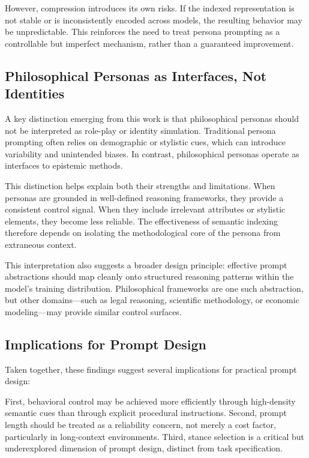 \documentclass[11pt]{article}
\begin{document}
However, compression introduces its own risks. If the indexed representation is not stable or is inconsistently encoded across models, the resulting behavior may be unpredictable. This reinforces the need to treat persona prompting as a controllable but imperfect mechanism, rather than a guaranteed improvement.

\subsection{Philosophical Personas as Interfaces, Not Identities}

A key distinction emerging from this work is that philosophical personas should not be interpreted as role-play or identity simulation. Traditional persona prompting often relies on demographic or stylistic cues, which can introduce variability and unintended biases. In contrast, philosophical personas operate as interfaces to epistemic methods.

This distinction helps explain both their strengths and limitations. When personas are grounded in well-defined reasoning frameworks, they provide a consistent control signal. When they include irrelevant attributes or stylistic elements, they become less reliable. The effectiveness of semantic indexing therefore depends on isolating the methodological core of the persona from extraneous context.

This interpretation also suggests a broader design principle: effective prompt abstractions should map cleanly onto structured reasoning patterns within the model’s training distribution. Philosophical frameworks are one such abstraction, but other domains—such as legal reasoning, scientific methodology, or economic modeling—may provide similar control surfaces.

\subsection{Implications for Prompt Design}

Taken together, these findings suggest several implications for practical prompt design:

First, behavioral control may be achieved more efficiently through high-density semantic cues than through explicit procedural instructions. Second, prompt length should be treated as a reliability concern, not merely a cost factor, particularly in long-context environments. Third, stance selection is a critical but underexplored dimension of prompt design, distinct from task specification.
\end{document}
